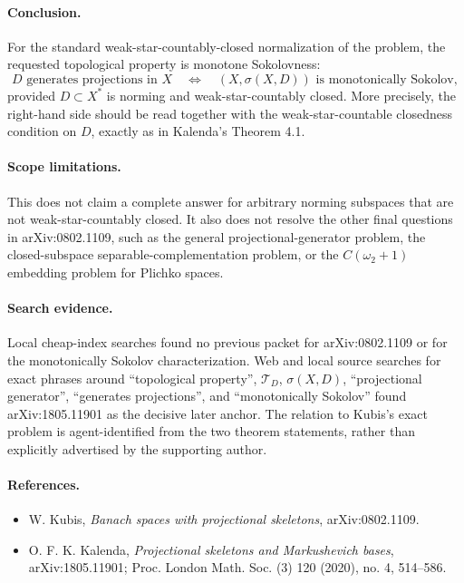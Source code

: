 \documentclass[11pt]{article}
\newcommand{\Tau}{\mathcal T}
\begin{document}
\paragraph{Conclusion.}
For the standard weak-star-countably-closed normalization of the problem, the
requested topological property is monotone Sokolovness:
\[
  D \text{ generates projections in } X
  \quad\Longleftrightarrow\quad
  (X,\sigma(X,D)) \text{ is monotonically Sokolov},
\]
provided \(D\subset X^*\) is norming and weak-star-countably closed.  More
precisely, the right-hand side should be read together with the
weak-star-countable closedness condition on \(D\), exactly as in Kalenda's
Theorem 4.1.

\paragraph{Scope limitations.}
This does not claim a complete answer for arbitrary norming subspaces that are
not weak-star-countably closed.  It also does not resolve the other final
questions in arXiv:0802.1109, such as the general projectional-generator
problem, the closed-subspace separable-complementation problem, or the
\(C(\omega_2+1)\) embedding problem for Plichko spaces.

\paragraph{Search evidence.}
Local cheap-index searches found no previous packet for arXiv:0802.1109 or
for the monotonically Sokolov characterization.  Web and local source searches
for exact phrases around ``topological property'', \(\Tau_D\),
\(\sigma(X,D)\), ``projectional generator'', ``generates projections'', and
``monotonically Sokolov'' found arXiv:1805.11901 as the decisive later anchor.
The relation to Kubis's exact problem is agent-identified from the two theorem
statements, rather than explicitly advertised by the supporting author.

\paragraph{References.}
\begin{itemize}
\item W. Kubis, \emph{Banach spaces with projectional skeletons}, arXiv:0802.1109.
\item O. F. K. Kalenda, \emph{Projectional skeletons and Markushevich bases},
  arXiv:1805.11901; Proc. London Math. Soc. (3) 120 (2020), no. 4, 514--586.
\end{itemize}
\end{document}
